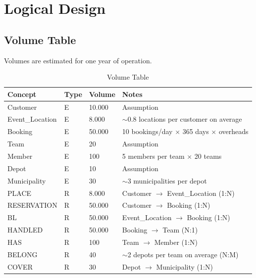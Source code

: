 \section{Logical Design}

\subsection{Volume Table}
Volumes are estimated for one year of operation.

\begin{table}[H]
    \scriptsize
    \renewcommand{\arraystretch}{1.3}
    \begin{tabularx}{\textwidth}{|X|X|X|X|}
    \hline
    \textbf{Concept} & \textbf{Type} & \textbf{Volume} & \textbf{Notes} \\ \hline
    Customer        & E & 10.000  & Assumption \\ \hline
    Event\_Location & E & 8.000   & $\sim$0.8 locations per customer on average \\ \hline
    Booking         & E & 50.000  & 10 bookings/day $\times$ 365 days $\times$ overheads \\ \hline
    Team            & E & 20      & Assumption \\ \hline
    Member          & E & 100     & 5 members per team $\times$ 20 teams \\ \hline
    Depot           & E & 10      & Assumption \\ \hline
    Municipality    & E & 30      & $\sim$3 municipalities per depot \\ \hline
    PLACE           & R & 8.000   & Customer $\to$ Event\_Location (1:N) \\ \hline
    RESERVATION     & R & 50.000  & Customer $\to$ Booking (1:N) \\ \hline
    BL              & R & 50.000  & Event\_Location $\to$ Booking (1:N) \\ \hline
    HANDLED         & R & 50.000  & Booking $\to$ Team (N:1) \\ \hline
    HAS             & R & 100     & Team $\to$ Member (1:N) \\ \hline
    BELONG          & R & 40      & $\sim$2 depots per team on average (N:M) \\ \hline
    COVER           & R & 30      & Depot $\to$ Municipality (1:N) \\ \hline
    \end{tabularx}
    \caption{Volume Table}
\end{table}

